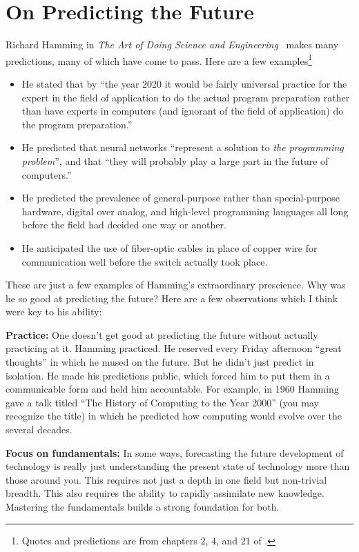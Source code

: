 \section{On Predicting the Future}
\label{sec:predicting_future}

Richard Hamming in \emph{The Art of
Doing Science and Engineering}~\citep{hamming1997art} makes many predictions,
many of which have come to pass. Here are a few examples\footnote{Quotes and
predictions are from chapters 2, 4, and 21 of \citet{hamming1997art}.}
\begin{itemize}
    \item He stated that by ``the year 2020 it would be fairly universal
        practice for the expert in the field of application to do the actual
        program preparation rather than have experts in computers (and ignorant
        of the field of application) do the program preparation.''
    \item He predicted that neural networks ``represent a solution to \emph{the
        programming problem}'', and that ``they will probably play a large part
        in the future of computers.''
    \item He predicted the prevalence of general-purpose rather than
        special-purpose hardware, digital over analog, and high-level
        programming languages all long before the field had decided one way or
        another.
    \item He anticipated the use of fiber-optic cables in place of copper wire
        for communication well before the switch actually took place.
\end{itemize}

These are just a few examples of Hamming's extraordinary prescience. Why was he
so good at predicting the future? Here are a few observations which I think
were key to his ability:

{\bf Practice:} One doesn't get good at predicting the future without actually
practicing at it. Hamming practiced. He reserved every Friday afternoon ``great
thoughts'' in which he mused on the future. But he didn't just predict in
isolation. He made his predictions public, which forced him to put them in a
communicable form and held him accountable. For example, in 1960 Hamming gave a
talk titled ``The History of Computing to the Year 2000'' (you may recognize
the title) in which he predicted how computing would evolve over the several
decades.

{\bf Focus on fundamentals:} In some ways, forecasting the future development
of technology is really just understanding the present state of technology more
than those around you. This requires not just a depth in one field but
non-trivial breadth. This also requires the ability to rapidly assimilate new
knowledge. Mastering the fundamentals builds a strong foundation for both.

